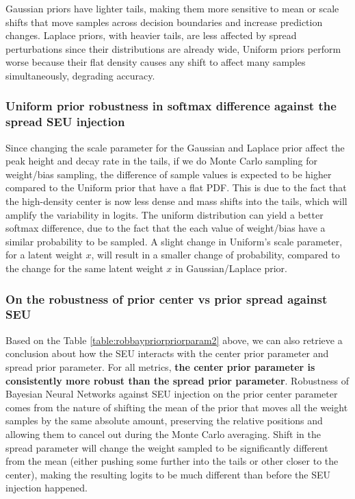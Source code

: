 Gaussian priors have lighter tails, making them more sensitive to mean or scale shifts that move samples across decision boundaries and increase prediction changes. Laplace priors, with heavier tails, are less affected by spread perturbations since their distributions are already wide, Uniform priors perform worse because their flat density causes any shift to affect many samples simultaneously, degrading accuracy.

\subsubsection{Uniform prior robustness in softmax difference against the spread SEU injection}

Since changing the scale parameter for the Gaussian and Laplace prior affect the peak height and decay rate in the tails, if we do Monte Carlo sampling for weight/bias sampling, the difference of sample values is expected to be higher compared to the Uniform prior that have a flat PDF. This is due to the fact that the high-density center is now less dense and mass shifts into the tails, which will amplify the variability in logits. The uniform distribution can yield a better softmax difference, due to the fact that the each value of weight/bias have a similar probability to be sampled. A slight change in Uniform's scale parameter, for a latent weight $x$, will result in a smaller change of probability, compared to the change for the same latent weight $x$ in Gaussian/Laplace prior.

\subsubsection{On the robustness of prior center vs prior spread against SEU}


Based on the Table \ref{table:robbaypriorpriorparam2} above, we can also retrieve a conclusion about how the SEU interacts with the center prior parameter and spread prior parameter. For all metrics, \textbf{the center prior parameter is consistently more robust than the spread prior parameter}. Robustness of Bayesian Neural Networks against SEU injection on the prior center parameter comes from the nature of shifting the mean of the prior that moves all the weight samples by the same absolute amount, preserving the relative positions and allowing them to cancel out during the Monte Carlo averaging. Shift in the spread parameter will change the weight sampled to be significantly different from the mean (either pushing some further into the tails or other closer to the center), making the resulting logits to be much different than before the SEU injection happened.

